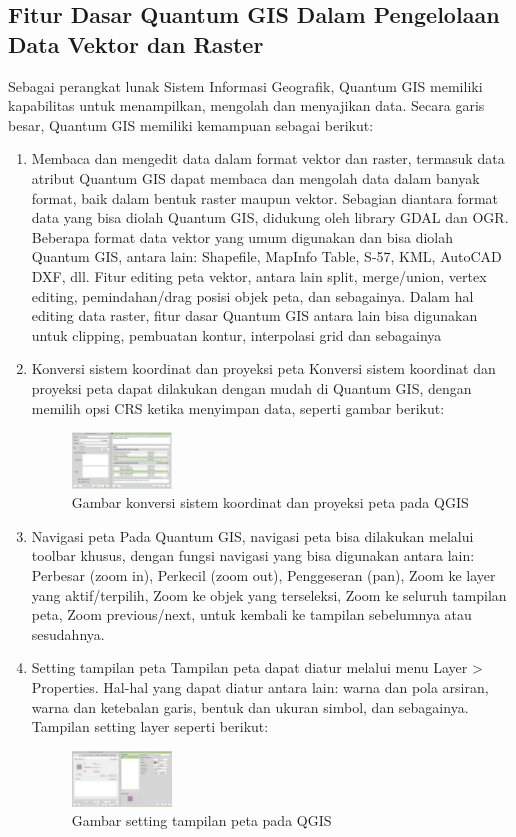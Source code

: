 \subsection{Fitur Dasar Quantum GIS Dalam Pengelolaan Data Vektor dan Raster}
Sebagai perangkat lunak Sistem Informasi Geografik, Quantum GIS memiliki kapabilitas untuk menampilkan, mengolah dan menyajikan data. Secara garis besar, Quantum GIS memiliki kemampuan sebagai berikut:
\begin{enumerate}
\item
Membaca dan mengedit data dalam format vektor dan raster, termasuk data atribut
Quantum GIS dapat membaca dan mengolah data dalam banyak format, baik dalam bentuk raster maupun vektor. Sebagian diantara format data yang bisa diolah Quantum GIS, didukung oleh library GDAL dan OGR. Beberapa format data vektor yang umum digunakan dan bisa diolah Quantum GIS, antara lain: Shapefile, MapInfo Table, S-57, KML, AutoCAD DXF, dll.
Fitur editing peta vektor, antara lain split, merge/union, vertex editing, pemindahan/drag posisi objek peta, dan sebagainya. Dalam hal editing data raster, fitur dasar Quantum GIS antara lain bisa digunakan untuk clipping, pembuatan kontur, interpolasi grid dan sebagainya
\item
Konversi sistem koordinat dan proyeksi peta
Konversi sistem koordinat dan proyeksi peta dapat dilakukan dengan mudah di Quantum GIS, dengan memilih opsi CRS ketika menyimpan data, seperti gambar berikut:
\begin{figure}[ht]
    \centerline{\includegraphics[width=0.25\textwidth]{figures/proyeksi.png}}
    \caption{Gambar konversi sistem koordinat dan proyeksi peta pada QGIS}
    \label{proyeksi}
    \end{figure}
\item
Navigasi peta
Pada Quantum GIS, navigasi peta bisa dilakukan melalui toolbar khusus, dengan fungsi navigasi yang bisa digunakan antara lain: Perbesar (zoom in), Perkecil (zoom out), Penggeseran (pan), Zoom ke layer yang aktif/terpilih, Zoom ke objek yang terseleksi, Zoom ke seluruh tampilan peta, Zoom previous/next, untuk kembali ke tampilan sebelumnya atau sesudahnya.
\item
Setting tampilan peta
Tampilan peta dapat diatur melalui menu Layer > Properties. Hal-hal yang dapat diatur antara lain: warna dan pola arsiran, warna dan ketebalan garis, bentuk dan ukuran simbol, dan sebagainya. Tampilan setting layer seperti berikut:
\begin{figure}[ht]
    \centerline{\includegraphics[width=0.25\textwidth]{figures/setting.png}}
    \caption{Gambar setting tampilan peta pada QGIS}
    \label{setting}
    \end{figure}
\end{enumerate}

